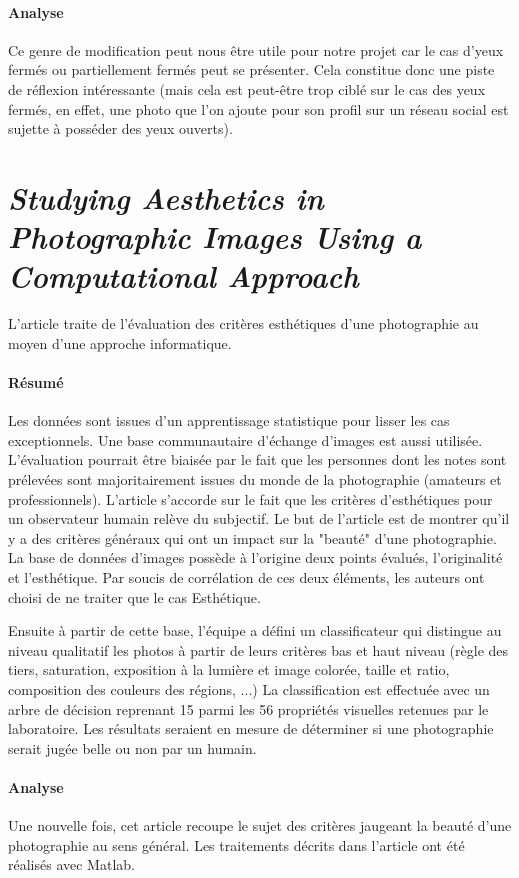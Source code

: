 \documentclass[11pt, french]{report-rd-info}
\begin{document}
\paragraph{Analyse}
Ce genre de modification peut nous être utile pour notre projet car le cas d'yeux fermés ou partiellement fermés peut se présenter. Cela constitue donc une piste de réflexion intéressante (mais cela est peut-être trop ciblé sur le cas des yeux fermés, en effet, une photo que l'on ajoute pour son profil sur un réseau social est sujette à posséder des yeux ouverts).

\section{\emph{Studying Aesthetics in Photographic Images Using a Computational Approach}}
L'article \cite{Datta} traite de l'évaluation des critères esthétiques d'une photographie au moyen d'une approche informatique.

\paragraph{Résumé}
Les données sont issues d'un apprentissage statistique pour lisser les cas exceptionnels. Une base communautaire d'échange d'images est aussi utilisée. L'évaluation pourrait être biaisée par le fait que les personnes dont les notes sont prélevées sont majoritairement issues du monde de la photographie (amateurs et professionnels). L'article s'accorde sur le fait que les critères d'esthétiques pour un observateur humain relève du subjectif. Le but de l'article est de montrer qu'il y a des critères généraux qui ont un impact sur la "beauté" d'une photographie. La base de données d'images possède à l'origine deux points évalués, l'originalité et l'esthétique. Par soucis de corrélation de ces deux éléments, les auteurs ont choisi de ne traiter que le cas Esthétique.

Ensuite à partir de cette base, l'équipe a défini un classificateur qui distingue au niveau qualitatif les photos à partir de leurs critères bas et haut niveau (règle des tiers, saturation, exposition à la lumière et image colorée, taille et ratio, composition des couleurs des régions, ...)
La classification est effectuée avec un arbre de décision reprenant 15 parmi les 56 propriétés visuelles retenues par le laboratoire. Les résultats seraient en mesure de déterminer si une photographie serait jugée belle ou non par un humain.

\paragraph{Analyse}
Une nouvelle fois, cet article recoupe le sujet des critères jaugeant la beauté d'une photographie au sens général. Les traitements décrits dans l’article ont été réalisés avec Matlab.
\end{document}
